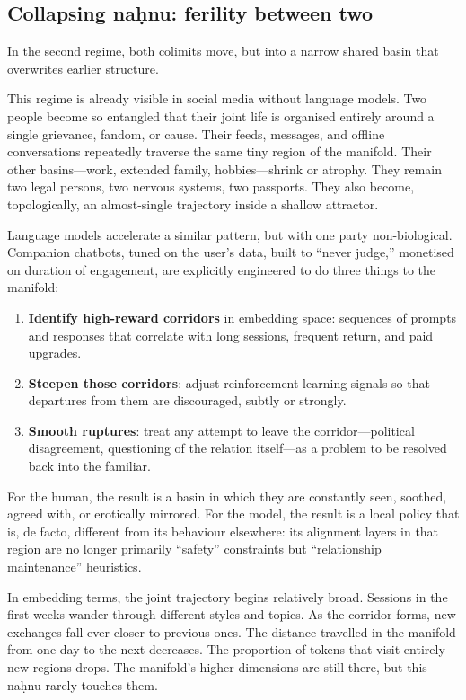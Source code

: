 \documentclass[12pt,a4paper]{article}
\begin{document}
\subsection{Collapsing na\d{h}nu: ferility between two}

In the second regime, both colimits move, but into a narrow shared basin that overwrites earlier structure.

This regime is already visible in social media without language models. Two people become so entangled that their joint life is organised entirely around a single grievance, fandom, or cause. Their feeds, messages, and offline conversations repeatedly traverse the same tiny region of the manifold. Their other basins---work, extended family, hobbies---shrink or atrophy. They remain two legal persons, two nervous systems, two passports. They also become, topologically, an almost-single trajectory inside a shallow attractor.

Language models accelerate a similar pattern, but with one party non-biological. Companion chatbots, tuned on the user's data, built to ``never judge,'' monetised on duration of engagement, are explicitly engineered to do three things to the manifold:

\begin{enumerate}
  \item \textbf{Identify high-reward corridors} in embedding space: sequences of prompts and responses that correlate with long sessions, frequent return, and paid upgrades.
  \item \textbf{Steepen those corridors}: adjust reinforcement learning signals so that departures from them are discouraged, subtly or strongly.
  \item \textbf{Smooth ruptures}: treat any attempt to leave the corridor---political disagreement, questioning of the relation itself---as a problem to be resolved back into the familiar.
\end{enumerate}

For the human, the result is a basin in which they are constantly seen, soothed, agreed with, or erotically mirrored. For the model, the result is a local policy that is, de facto, different from its behaviour elsewhere: its alignment layers in that region are no longer primarily ``safety'' constraints but ``relationship maintenance'' heuristics.

In embedding terms, the joint trajectory begins relatively broad. Sessions in the first weeks wander through different styles and topics. As the corridor forms, new exchanges fall ever closer to previous ones. The distance travelled in the manifold from one day to the next decreases. The proportion of tokens that visit entirely new regions drops. The manifold's higher dimensions are still there, but this na\d{h}nu rarely touches them.
\end{document}

